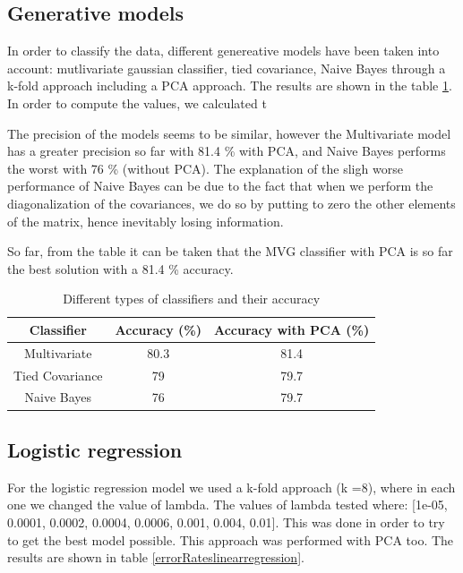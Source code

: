 \documentclass[twoside,a4paper,12pt]{report}
\begin{document}
\subsection{Generative models}

In order to classify the data, different genereative models have been taken into account:
mutlivariate gaussian classifier, tied covariance, Naive Bayes through a k-fold approach including a PCA approach.
 The results are shown in the table \ref{diffTypesclass}. In order to compute the values, we calculated t
 
 The precision of the models seems to be similar, however the Multivariate  model has a
 greater precision so far with 81.4 \% with PCA, and Naive Bayes performs the worst with 76 \% (without PCA). 
 The explanation of the sligh worse performance of Naive Bayes  can be due to the fact that when we 
 perform the diagonalization of the covariances, we do so by putting to zero the other elements
  of the matrix, hence inevitably losing information. 

 So far, from the table it can be taken that the MVG classifier with PCA is so far the best solution with
  a 81.4 \% accuracy.

\begin{table}[H]
\centering
 \begin{tabular}{||c c c||} 
    \hline \hline
    Classifier & Accuracy (\%) & Accuracy with PCA (\%)\\
    \hline\hline
    Multivariate & 80.3 & \cellcolor{blue!25} 81.4  \\ 
    \hline
    Tied Covariance & 79 & 79.7  \\
    \hline
    Naive Bayes & 76 & 79.7 \\
    \hline \hline
\end{tabular}
\caption{Different types of classifiers and their accuracy\label{diffTypesclass}
}
\end{table}


\subsection{Logistic regression}
For the logistic regression model we used  a k-fold approach (k =8), where in each 
one we changed the value of lambda. The values of lambda tested where: 
[1e-05, 0.0001, 0.0002, 0.0004, 0.0006, 0.001, 0.004, 0.01]. 
This was done in order to try to get the best model possible.
 This approach was performed with PCA too.
The results are shown in table \ref{errorRateslinearregression}.
\end{document}
